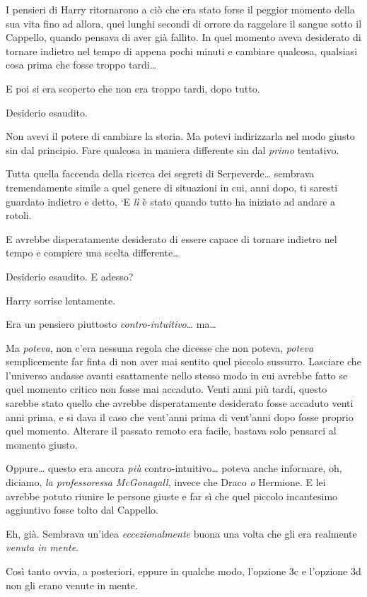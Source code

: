 I pensieri di Harry ritornarono a ciò che era stato forse il peggior momento della sua vita fino ad allora, quei lunghi secondi di orrore da raggelare il sangue sotto il Cappello, quando pensava di aver già fallito. In quel momento aveva desiderato di tornare indietro nel tempo di appena pochi minuti e cambiare qualcosa, qualsiasi cosa prima che fosse troppo tardi…

E poi si era scoperto che non era troppo tardi, dopo tutto.

Desiderio esaudito.

Non avevi il potere di cambiare la storia. Ma potevi indirizzarla nel modo giusto sin dal principio. Fare qualcosa in maniera differente sin dal \textit{primo} tentativo.

Tutta quella faccenda della ricerca dei segreti di Serpeverde… sembrava tremendamente simile a quel genere di situazioni in cui, anni dopo, ti saresti guardato indietro e detto, ‘E \textit{lì} è stato quando tutto ha iniziato ad andare a rotoli.

E avrebbe disperatamente desiderato di essere capace di tornare indietro nel tempo e compiere una scelta differente…

Desiderio esaudito. E adesso?

Harry sorrise lentamente.

Era un pensiero piuttosto \textit{contro-intuitivo}… ma…

Ma \textit{poteva}, non c’era nessuna regola che dicesse che non poteva, \textit{poteva} semplicemente far finta di non aver mai sentito quel piccolo sussurro. Lasciare che l’universo andasse avanti esattamente nello stesso modo in cui avrebbe fatto se quel momento critico non fosse mai accaduto. Venti anni più tardi, questo sarebbe stato quello che avrebbe disperatamente desiderato fosse accaduto venti anni prima, e si dava il caso che vent’anni prima di vent’anni dopo fosse proprio quel momento. Alterare il passato remoto era facile, bastava solo pensarci al momento giusto.

Oppure… questo era ancora \textit{più} contro-intuitivo… poteva anche informare, oh, diciamo, \textit{la professoressa McGonagall}, invece che Draco \textit{o} Hermione. E lei avrebbe potuto riunire le persone giuste e far sì che quel piccolo incantesimo aggiuntivo fosse tolto dal Cappello.

Eh, già. Sembrava un’idea \textit{eccezionalmente} buona una volta che gli era realmente \textit{venuta in mente}.

Così tanto ovvia, a posteriori, eppure in qualche modo, l’opzione 3c e l’opzione 3d non gli erano venute in mente.

